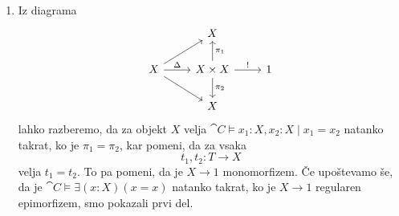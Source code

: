 \documentclass[../kategoricna_logika.tex]{subfiles}
\begin{document}
  \begin{dokaz}
    \begin{enumerate}[label=(\roman*)]
    \item Iz diagrama
      \begin{equation*}
        \begin{tikzcd}[row sep=normal]
          & X & \\
          X \ar[ur] \ar[r, "\Delta"] \ar[dr] & X \times X \ar[u, "\pi_1"'] \ar[d, "\pi_2"] \ar[r, "!"] & 1 \\
          & X &
        \end{tikzcd}
      \end{equation*}
      lahko razberemo, da za objekt $X$ velja
      $\cat{C} \models x_1:X,x_2:X \mid x_1 = x_2$ natanko takrat, ko je
      $\pi_1 = \pi_2$, kar pomeni, da za vsaka $$t_1,t_2:T \to X$$ velja
      $t_1 = t_2$. To pa pomeni, da je $X \to 1$ monomorfizem.
      Če upoštevamo
      še, da je $\cat{C} \models \exists (x:X) (x = x)$ natanko takrat, ko
      je $X \to 1$ regularen epimorfizem, smo pokazali prvi del.
      

\end{enumerate}
\end{dokaz}
\end{document}

